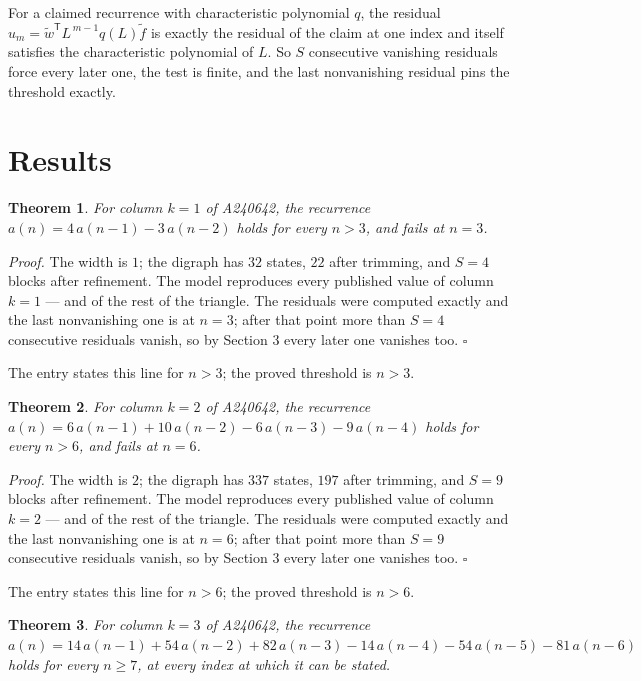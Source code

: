 \documentclass[11pt]{article}
\newtheorem{theorem}{Theorem}
\theoremstyle{definition}
\begin{document}
For a claimed recurrence with characteristic polynomial $q$, the residual $u_m = \tilde w^{\mathsf T}L^{\,m-1}q(L)\tilde f$ is exactly the residual of the claim at one index and itself satisfies the characteristic polynomial of $L$. So $S$ consecutive vanishing residuals force every later one, the test is finite, and the last nonvanishing residual pins the threshold exactly.

\section{Results}

\begin{theorem} For column $k = 1$ of A240642, the recurrence $a(n) = 4\,a(n-1) - 3\,a(n-2)$ holds for every $n > 3$, and fails at $n = 3$.\end{theorem}

{\itshape Proof.} The width is $1$; the digraph has $32$ states, $22$ after trimming, and $S = 4$ blocks after refinement. The model reproduces every published value of column $k = 1$ --- and of the rest of the triangle. The residuals were computed exactly and the last nonvanishing one is at $n = 3$; after that point more than $S = 4$ consecutive residuals vanish, so by Section 3 every later one vanishes too. $\square$

The entry states this line for $n > 3$; the proved threshold is $n > 3$.

\begin{theorem} For column $k = 2$ of A240642, the recurrence $a(n) = 6\,a(n-1) + 10\,a(n-2) - 6\,a(n-3) - 9\,a(n-4)$ holds for every $n > 6$, and fails at $n = 6$.\end{theorem}

{\itshape Proof.} The width is $2$; the digraph has $337$ states, $197$ after trimming, and $S = 9$ blocks after refinement. The model reproduces every published value of column $k = 2$ --- and of the rest of the triangle. The residuals were computed exactly and the last nonvanishing one is at $n = 6$; after that point more than $S = 9$ consecutive residuals vanish, so by Section 3 every later one vanishes too. $\square$

The entry states this line for $n > 6$; the proved threshold is $n > 6$.

\begin{theorem} For column $k = 3$ of A240642, the recurrence $a(n) = 14\,a(n-1) + 54\,a(n-2) + 82\,a(n-3) - 14\,a(n-4) - 54\,a(n-5) - 81\,a(n-6)$ holds for every $n \ge 7$, at every index at which it can be stated.\end{theorem}
\end{document}
